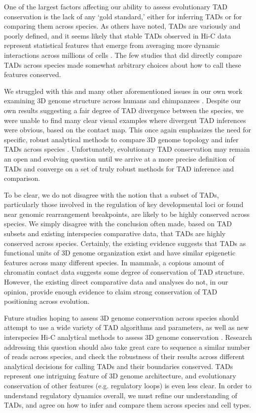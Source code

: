 One of the largest factors affecting our ability to assess evolutionary TAD conservation is the lack of any `gold standard,' either for inferring TADs or for comparing them across species. As others have noted, TADs are variously and poorly defined, and it seems likely that stable TADs observed in Hi-C data represent statistical features that emerge from averaging more dynamic interactions across millions of cells \cite{Wit.2019}. The few studies that did directly compare TADs across species made somewhat arbitrary choices about how to call these features conserved.

We struggled with this and many other aforementioned issues in our own work examining 3D genome structure across humans and chimpanzees \cite{Eres.2019}. Despite our own results suggesting a fair degree of TAD divergence between the species, we were unable to find many clear visual examples where divergent TAD inferences were obvious, based on the contact map. This once again emphasizes the need for specific, robust analytical methods to compare 3D genome topology and infer TADs across species . Unfortunately, evolutionary TAD conservation may remain an open and evolving question until we arrive at a more precise definition of TADs and converge on a set of truly robust methods for TAD inference and comparison.

To be clear, we do not disagree with the notion that a subset of TADs, particularly those involved in the regulation of key developmental loci or found near genomic rearrangement breakpoints, are likely to be highly conserved across species. We simply disagree with the conclusion often made, based on TAD subsets and existing interspecies comparative data, that TADs are highly conserved across species. Certainly, the existing evidence suggests that TADs as functional units of 3D genome organization exist and have similar epigenetic features across many different species. In mammals, a copious amount of chromatin contact data suggests some degree of conservation of TAD structure. However, the existing direct comparative data and analyses do not, in our opinion, provide enough evidence to claim strong conservation of TAD positioning across evolution.

Future studies hoping to assess 3D genome conservation across species should attempt to use a wide variety of TAD algorithms and parameters, as well as new interspecies Hi-C analytical methods to assess 3D genome conservation \cite{Yang.2019, Nuriddinov.2019}. Research addressing this question should also take great care to sequence a similar number of reads across species, and check the robustness of their results across different analytical decisions for calling TADs and their boundaries conserved. TADs represent one intriguing feature of 3D genome architecture, and evolutionary conservation of other features (e.g. regulatory loops) is even less clear. In order to understand regulatory dynamics overall, we must refine our understanding of TADs, and agree on how to infer and compare them across species and cell types.

